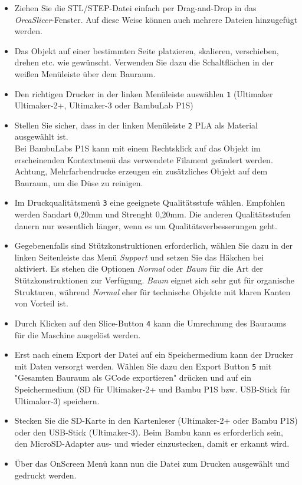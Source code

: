 \documentclass{\basedir/fablab-document}
\begin{document}
\begin{itemize}
\item Ziehen Sie die STL/STEP-Datei einfach per Drag-and-Drop in das \textit{OrcaSlicer}-Fenster. Auf diese Weise können auch mehrere Dateien hinzugefügt werden.
\item Das Objekt auf einer bestimmten Seite platzieren, skalieren, verschieben, drehen etc. wie gewünscht. Verwenden Sie dazu die Schaltflächen in der weißen Menüleiste über dem Bauraum.
\item Den richtigen Drucker in der linken Menüleiste auswählen \large\textcircled{\normalsize \texttt{1}} (Ultimaker Ultimaker-2+, Ultimaker-3 oder BambuLab P1S)
\item Stellen Sie sicher, dass in der linken Menüleiste \large\textcircled{\normalsize \texttt{2}} PLA als Material ausgewählt ist.\\Bei BambuLabs P1S kann mit einem Rechtsklick auf das Objekt im erscheinenden Kontextmenü das verwendete Filament geändert werden. Achtung, Mehrfarbendrucke erzeugen ein zusätzliches Objekt auf dem Bauraum, um die Düse zu reinigen. 
\item Im Druckqualitätsmenü \large\textcircled{\normalsize \texttt{3}} eine geeignete Qualitätsstufe wählen. Empfohlen werden Sandart 0,20mm und Strenght 0,20mm. Die anderen Qualitätsstufen dauern nur wesentlich länger, wenn es um Qualitätsverbesserungen geht. 
\item Gegebenenfalls sind Stützkonstruktionen erforderlich, wählen Sie dazu in der linken Seitenleiste das Menü \textit{Support} und setzen Sie das Häkchen bei aktiviert. Es stehen die Optionen \textit{Normal} oder \textit{Baum} für die Art der Stützkonstruktionen zur Verfügung. \textit{Baum} eignet sich sehr gut für organische Strukturen, während \textit{Normal} eher für technische Objekte mit klaren Kanten von Vorteil ist. 
\item Durch Klicken auf den Slice-Button \large\textcircled{\normalsize \texttt{4}} kann die Umrechnung des Bauraums für die Maschine ausgelöst werden. 
\item Erst nach einem Export der Datei auf ein Speichermedium kann der Drucker mit Daten versorgt werden. Wählen Sie dazu den Export Button \large\textcircled{\normalsize \texttt{5}} mit "Gesamten Bauraum als GCode exportieren" drücken und auf ein Speichermedium (SD für Ultimaker-2+ und Bambu P1S bzw. USB-Stick für Ultimaker-3) speichern.
\item Stecken Sie die SD-Karte in den Kartenleser (Ultimaker-2+ oder Bambu P1S) oder den USB-Stick (Ultimaker-3). Beim Bambu kann es erforderlich sein, den MicroSD-Adapter aus- und wieder einzustecken, damit er erkannt wird. 
\item Über das OnScreen Menü kann nun die Datei zum Drucken ausgewählt und gedruckt werden. 
\end{itemize}
\end{document}
